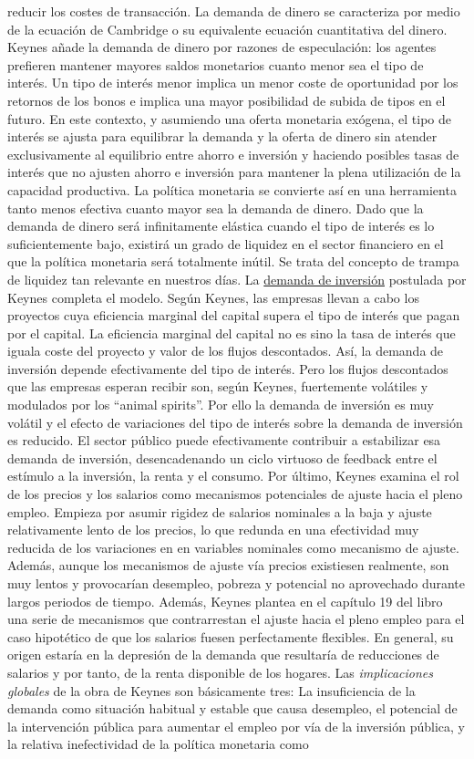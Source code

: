 \documentclass{nuevotema}
\begin{document}
reducir los costes de transacción. La demanda de dinero se caracteriza por medio de la ecuación de Cambridge o su equivalente ecuación cuantitativa del dinero. Keynes añade la demanda de dinero por razones de especulación: los agentes prefieren mantener mayores saldos monetarios cuanto menor sea el tipo de interés. Un tipo de interés menor implica un menor coste de oportunidad por los retornos de los bonos e implica una mayor posibilidad de subida de tipos en el futuro. En este contexto, y asumiendo una oferta monetaria exógena, el tipo de interés se ajusta para equilibrar la demanda y la oferta de dinero sin atender exclusivamente al equilibrio entre ahorro e inversión y haciendo posibles tasas de interés que no ajusten ahorro e inversión para mantener la plena utilización de la capacidad productiva. La política monetaria se convierte así en una herramienta tanto menos efectiva cuanto mayor sea la demanda de dinero. Dado que la demanda de dinero será infinitamente elástica cuando el tipo de interés es lo suficientemente bajo, existirá un grado de liquidez en el sector financiero en el que la política monetaria será totalmente inútil. Se trata del concepto de trampa de liquidez tan relevante en nuestros días. La \underline{demanda de inversión} postulada por Keynes completa el modelo. Según Keynes, las empresas llevan a cabo los proyectos cuya eficiencia marginal del capital supera el tipo de interés que pagan por el capital. La eficiencia marginal del capital no es sino la tasa de interés que iguala coste del proyecto y valor de los flujos descontados. Así, la demanda de inversión depende efectivamente del tipo de interés. Pero los flujos descontados que las empresas esperan recibir son, según Keynes, fuertemente volátiles y modulados por los ``animal spirits''. Por ello la demanda de inversión es muy volátil y el efecto de variaciones del tipo de interés sobre la demanda de inversión es reducido. El sector público puede efectivamente contribuir a estabilizar esa demanda de inversión, desencadenando un ciclo virtuoso de feedback entre el estímulo a la inversión, la renta y el consumo. Por último, Keynes examina el rol de los precios y los salarios como mecanismos potenciales de ajuste hacia el pleno empleo. Empieza por asumir rigidez de salarios nominales a la baja y ajuste relativamente lento de los precios, lo que redunda en una efectividad muy reducida de los variaciones en en variables nominales como mecanismo de ajuste. Además, aunque los mecanismos de ajuste vía precios existiesen realmente, son muy lentos y provocarían desempleo, pobreza y potencial no aprovechado durante largos periodos de tiempo. Además, Keynes plantea en el capítulo 19 del libro una serie de mecanismos que contrarrestan el ajuste hacia el pleno empleo para el caso hipotético de que los salarios fuesen perfectamente flexibles. En general, su origen estaría en la depresión de la demanda que resultaría de reducciones de salarios y por tanto, de la renta disponible de los hogares. Las \textit{implicaciones globales} de la obra de Keynes son básicamente tres: La insuficiencia de la demanda como situación habitual y estable que causa desempleo, el potencial de la intervención pública para aumentar el empleo por vía de la inversión pública, y la relativa inefectividad de la política monetaria como 
\end{document}
